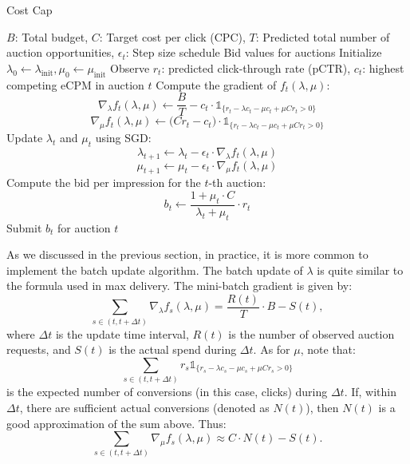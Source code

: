 \documentclass[../main.tex]{subfiles}
\begin{document}
\begin{section}{Cost Cap}
		
		\begin{algorithm}[H]
			\caption{Dual Online Gradient Descent (DOGD) for Cost Cap}
			\label{alg:dogd_cost_cap}
			\begin{algorithmic}[1]
				\Require $B$: Total budget, $C$: Target cost per click (CPC), $T$: Predicted total number of auction opportunities, $\epsilon_t$: Step size schedule
				\Ensure Bid values for auctions
				\State Initialize $\lambda_0 \gets \lambda_{\text{init}}, \mu_0 \gets \mu_{\text{init}}$ 
				\State Observe $r_t$: predicted click-through rate (pCTR), $c_t$: highest competing eCPM in auction $t$
				\State Compute the gradient of $f_t(\lambda, \mu)$:
				\[
				\nabla_\lambda f_t(\lambda, \mu) \gets \frac{B}{T} - c_t \cdot \mathds{1}_{\{r_t - \lambda c_t - \mu c_t + \mu C r_t > 0\}}
				\]
				\[
				\nabla_\mu f_t(\lambda, \mu) \gets \big(C r_t - c_t\big) \cdot \mathds{1}_{\{r_t - \lambda c_t - \mu c_t + \mu C r_t > 0\}}
				\]
				\State Update $\lambda_t$ and $\mu_t$ using SGD:
				\[
				\lambda_{t+1} \gets \lambda_t - \epsilon_t \cdot \nabla_\lambda f_t(\lambda, \mu)
				\]
				\[
				\mu_{t+1} \gets \mu_t - \epsilon_t \cdot \nabla_\mu f_t(\lambda, \mu)
				\]
				\State Compute the bid per impression for the $t$-th auction:
				\[
				b_t \gets \frac{1 + \mu_t \cdot C}{\lambda_t + \mu_t} \cdot r_t
				\]
				\State Submit $b_t$ for auction $t$
				\EndFor
			\end{algorithmic}
		\end{algorithm}
	
	As we discussed in the previous section, in practice, it is more common to implement the batch update algorithm. The batch update of $\lambda$ is quite similar to the formula used in max delivery. The mini-batch gradient is given by:
	\[
	\sum_{s \in (t, t+\Delta t)} \nabla_{\lambda} f_s(\lambda, \mu) = \frac{R(t)}{T} \cdot B - S(t),
	\]
	where $\Delta t$ is the update time interval, $R(t)$ is the number of observed auction requests, and $S(t)$ is the actual spend during $\Delta t$. As for $\mu$, note that:
	\[
	\sum_{s \in (t, t+\Delta t)} r_s \mathds{1}_{\{r_s - \lambda c_s - \mu c_s + \mu C r_s > 0\}}
	\]
	is the expected number of conversions (in this case, clicks) during $\Delta t$. If, within $\Delta t$, there are sufficient actual conversions (denoted as $N(t)$), then $N(t)$ is a good approximation of the sum above. Thus:
	\[
	\sum_{s \in (t, t+\Delta t)} \nabla_{\mu} f_s(\lambda, \mu) \approx C \cdot N(t) - S(t).
	\]
	

\end{section}
\end{document}
